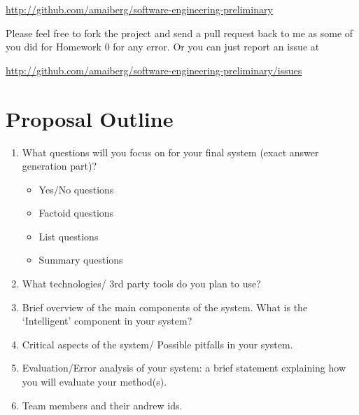 \documentclass[oneside]{memoir}
\begin{document}
\begin{titlingpage}
\begin{minipage}{1.2\textwidth}
\begin{enumerate}
\url{http://github.com/amaiberg/software-engineering-preliminary}

Please feel free to fork the project and send a pull request back to me as some
of you did for Homework 0 for any error. Or you can just report an issue at

\url{http://github.com/amaiberg/software-engineering-preliminary/issues}

\end{enumerate}

\end{minipage}
\hspace{-0.1\textwidth}

\end{titlingpage}



\newpage
\section*{Proposal Outline}
\begin{enumerate}
\item What questions will you focus on for your final system (exact answer generation part)?
\begin{itemize}
\item Yes/No questions
\item Factoid questions
\item List questions
\item Summary questions
\end{itemize}

\item What technologies/ 3rd party tools do you plan to use?

\item Brief overview of the main components of the system.
        What is the ‘Intelligent’ component in your system?

\item Critical aspects of the system/ Possible pitfalls in your system.

\item Evaluation/Error analysis of your system: a brief statement explaining how you will evaluate your
method(s).

\item Team members and their andrew ids.
\end{enumerate}
\end{document}
